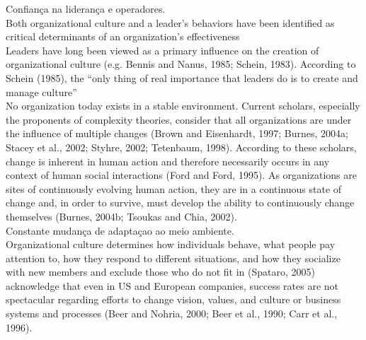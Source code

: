 Confiança na liderança e operadores.\\

Both organizational culture and a leader’s behaviors have been identified as critical determinants of an organization’s effectiveness\\

Leaders have long been viewed as a primary influence on the creation of organizational culture (e.g. Bennis and Nanus, 1985; Schein, 1983). According to Schein (1985), the “only thing of real importance that leaders do is to create and manage culture”\\






No organization today exists in a stable environment. Current scholars, especially the
proponents of complexity theories, consider that all organizations are under the influence
of multiple changes (Brown and Eisenhardt, 1997; Burnes, 2004a; Stacey et al., 2002;
Styhre, 2002; Tetenbaum, 1998). According to these scholars, change is inherent in
human action and therefore necessarily occurs in any context of human social interactions
(Ford and Ford, 1995). As organizations are sites of continuously evolving human action,
they are in a continuous state of change and, in order to survive, must develop the ability
to continuously change themselves (Burnes, 2004b; Tsoukas and Chia, 2002).\\

Constante mudança de adaptaçao ao meio ambiente.\\


Organizational culture determines how individuals behave, what people pay attention to,
how they respond to different situations, and how they socialize with new members and
exclude those who do not fit in (Spataro, 2005) \\

acknowledge that even in US and European companies, success rates are
not spectacular regarding efforts to change vision, values, and culture or business systems
and processes (Beer and Nohria, 2000; Beer et al., 1990; Carr et al., 1996).\\


